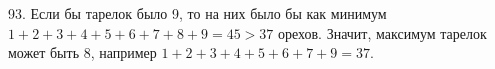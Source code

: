 93. Если бы тарелок было 9, то на них было бы как минимум $1+2+3+4+5+6+7+8+9=45>37$ орехов. Значит, максимум тарелок может быть 8, например $1+2+3+4+5+6+7+9=37.$\\
